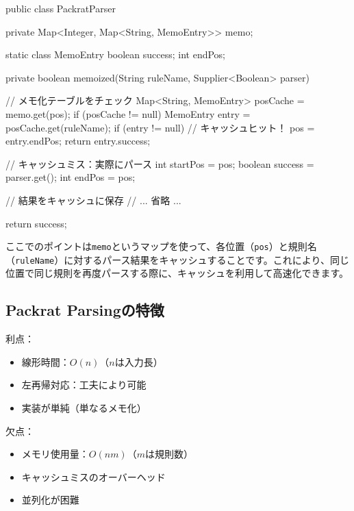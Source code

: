 \begin{codescreen}{}
public class PackratParser {
    private Map<Integer, Map<String, MemoEntry>> memo;
    
    static class MemoEntry {
        boolean success;
        int endPos;
    }
    
    private boolean memoized(String ruleName, Supplier<Boolean> parser) {
        // メモ化テーブルをチェック
        Map<String, MemoEntry> posCache = memo.get(pos);
        if (posCache != null) {
            MemoEntry entry = posCache.get(ruleName);
            if (entry != null) {
                // キャッシュヒット！
                pos = entry.endPos;
                return entry.success;
            }
        }
        
        // キャッシュミス：実際にパース
        int startPos = pos;
        boolean success = parser.get();
        int endPos = pos;
        
        // 結果をキャッシュに保存
        // ... 省略 ...
        
        return success;
    }
}
\end{codescreen}

ここでのポイントは\texttt{memo}というマップを使って、各位置（\texttt{pos}）と規則名（\texttt{ruleName}）に対するパース結果をキャッシュすることです。これにより、同じ位置で同じ規則を再度パースする際に、キャッシュを利用して高速化できます。

\subsection{Packrat Parsingの特徴}

利点：

\begin{itemize}
\item
  線形時間：\(O(n)\)（\(n\)は入力長）
\item
  左再帰対応：工夫により可能
\item
  実装が単純（単なるメモ化）
\end{itemize}

欠点：

\begin{itemize}
\item
  メモリ使用量：\(O(nm)\)（\(m\)は規則数）
\item
  キャッシュミスのオーバーヘッド
\item
  並列化が困難
\end{itemize}


